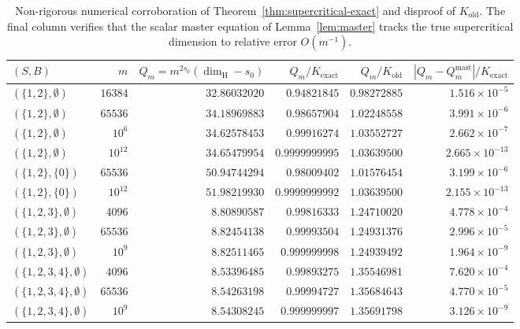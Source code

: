 \documentclass[11pt]{article}
\theoremstyle{definition}
\theoremstyle{remark}
\newcommand{\dimH}{\dim_{\mathrm{H}}}
\begin{document}
\begin{table}[ht]
\centering\small\setlength{\tabcolsep}{4pt}
\begin{tabular}{@{}lrrrrr@{}}
\toprule
$(S,B)$ & $m$ & $Q_m=m^{2s_0}(\dimH-s_0)$ & $Q_m/K_{\mathrm{exact}}$ & $Q_m/K_{\mathrm{old}}$ & $|Q_m-Q_m^{\mathrm{mast}}|/K_{\mathrm{exact}}$ \\
\midrule
$(\{1,2\},\emptyset)$ & $16384$ & $32.86032020$ & $0.94821845$ & $0.98272885$ & $1.516\times10^{-5}$ \\
$(\{1,2\},\emptyset)$ & $65536$ & $34.18969883$ & $0.98657904$ & $1.02248558$ & $3.991\times10^{-6}$ \\
$(\{1,2\},\emptyset)$ & $10^6$ & $34.62578453$ & $0.99916274$ & $1.03552727$ & $2.662\times10^{-7}$ \\
$(\{1,2\},\emptyset)$ & $10^{12}$ & $34.65479954$ & $0.9999999995$ & $1.03639500$ & $2.665\times10^{-13}$ \\
\midrule
$(\{1,2\},\{0\})$ & $65536$ & $50.94744294$ & $0.98009402$ & $1.01576454$ & $3.199\times10^{-6}$ \\
$(\{1,2\},\{0\})$ & $10^{12}$ & $51.98219930$ & $0.9999999992$ & $1.03639500$ & $2.155\times10^{-13}$ \\
\midrule
$(\{1,2,3\},\emptyset)$ & $4096$ & $8.80890587$ & $0.99816333$ & $1.24710020$ & $4.778\times10^{-4}$ \\
$(\{1,2,3\},\emptyset)$ & $65536$ & $8.82454138$ & $0.99993504$ & $1.24931376$ & $2.996\times10^{-5}$ \\
$(\{1,2,3\},\emptyset)$ & $10^9$ & $8.82511465$ & $0.999999998$ & $1.24939492$ & $1.964\times10^{-9}$ \\
\midrule
$(\{1,2,3,4\},\emptyset)$ & $4096$ & $8.53396485$ & $0.99893275$ & $1.35546981$ & $7.620\times10^{-4}$ \\
$(\{1,2,3,4\},\emptyset)$ & $65536$ & $8.54263198$ & $0.99994727$ & $1.35684643$ & $4.770\times10^{-5}$ \\
$(\{1,2,3,4\},\emptyset)$ & $10^9$ & $8.54308245$ & $0.999999997$ & $1.35691798$ & $3.126\times10^{-9}$ \\
\bottomrule
\end{tabular}
\caption{Non-rigorous numerical corroboration of
Theorem~\ref{thm:supercritical-exact} and disproof of $K_{\mathrm{old}}$.
The final column verifies that the scalar master equation of
Lemma~\ref{lem:master} tracks the true supercritical dimension to relative
error $O(m^{-1})$.}\label{tab:super-conv}
\end{table}
\end{document}
